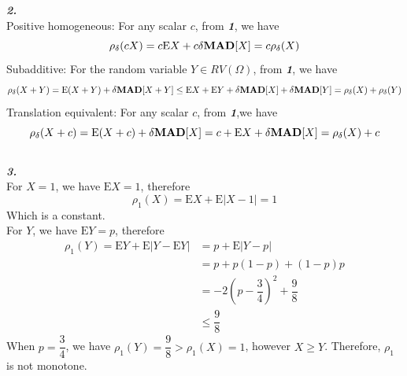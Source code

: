 \documentclass[11pt,a4paper]{article}
\begin{document}
\textit{\textbf{2.}}\\
Positive homogeneous: For any scalar $c$, from \textit{\textbf{1}}, we have
$$\rho_{\delta}(cX)=c\mathrm{E}X+c\delta\text{\textbf{MAD}}[X]=c\rho_{\delta}(X)$$
Subadditive: For the random variable $Y\in RV(\Omega)$, from \textit{\textbf{1}}, we have 
$$\rho_{\delta}(X+Y)=\mathrm{E}(X+Y)+\delta\text{\textbf{MAD}}[X+Y]\leq \mathrm{E}X+\mathrm{E}Y+\delta\text{\textbf{MAD}}[X]+\delta\text{\textbf{MAD}}[Y]=\rho_{\delta}(X)+\rho_{\delta}(Y)$$
Translation equivalent:
For any scalar $c$, from \textit{\textbf{1}},we have 
$$\rho_{\delta}(X+c)=\mathrm{E}(X+c)+\delta \text{\textbf{MAD}}[X]=c+\mathrm{E}X+\delta\text{\textbf{MAD}}[X]=\rho_{\delta}(X)+c$$\\


\textit{\textbf{3.}}\\
For $X=1$, we have $\mathrm{E}X=1$, therefore $$\rho_{1}(X)=\mathrm{E}X+\mathrm{E}|X-1|=1$$ Which is a constant.\\
For $Y$, we have $\mathrm{E}Y=p$, therefore
$$\begin{aligned}\rho_{1}(Y)=\mathrm{E}Y+\mathrm{E}|Y-\mathrm{E}Y|&=p+\mathrm{E}|Y-p|\\
&=p+p(1-p)+(1-p)p\\
&=-2(p-\dfrac{3}{4})^2+\dfrac{9}{8}\\
&\leq \dfrac{9}{8}
\end{aligned}$$
When $p=\dfrac{3}{4}$, we have $\rho_{1}(Y)=\dfrac{9}{8}>\rho_{1}(X)=1$, however $X\geq Y$. Therefore, $\rho_{1}$ is not monotone.\\
\end{document}
